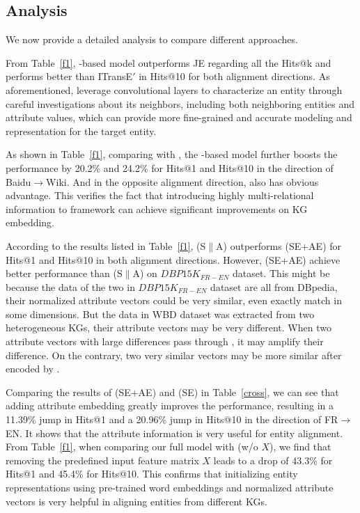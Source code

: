 \subsection{Analysis\label{sec:analysis}}



We now provide a detailed analysis to compare different approaches.

From Table~\ref{f1}, \GCN-based model outperforms JE regarding all the Hits@k and performs better than ITransE$'$ in Hits@10 for both alignment directions. As aforementioned, \GCNs leverage convolutional layers to characterize an entity through careful investigations about its neighbors, including both neighboring entities and attribute values, which can provide more fine-grained and accurate modeling and representation for the target entity.

 As shown in Table~\ref{f1}, comparing with \GCN, the \RGCN-based model further boosts the performance by 20.2\% and 24.2\% for Hits@1 and Hits@10 in the direction of Baidu$\rightarrow$Wiki. And in the opposite alignment direction, \RGCN also has obvious advantage. This verifies the fact that introducing highly multi-relational information to \GCN framework can achieve significant improvements on KG embedding.

According to the results listed in Table~\ref{f1}, \HRGCN (S$\|$A) outperforms \HRGCN (SE+AE) for Hits@1 and Hits@10 in both alignment directions. However, \HRGCN (SE+AE) achieve better performance than \HRGCN (S$\|$A) on $DBP15K_{FR-EN}$ dataset. This might be because the data of the two \KGs in $DBP15K_{FR-EN}$ dataset are all from DBpedia, their normalized attribute vectors could be very similar, even exactly match in some dimensions. But the data in WBD dataset was extracted from two heterogeneous KGs, their attribute vectors may be very different. When two attribute vectors with large differences pass through \HRGCNs, it may amplify their difference. On the contrary, two very similar vectors may be more similar after encoded by \HRGCNs.


Comparing the results of \HRGCN (SE+AE) and \HRGCN (SE) in Table~\ref{cross}, we can see that adding attribute embedding greatly improves the performance, resulting in a 11.39\% jump in Hits@1 and a 20.96\% jump in Hits@10 in the direction of FR$\rightarrow$EN. It shows that the attribute information is very useful for entity alignment.
From Table~\ref{f1}, when comparing our full model \HRGCN with \HRGCN (w/o $X$), we find that removing the predefined input feature matrix $X$ leads to a drop of 43.3\% for Hits@1 and 45.4\% for Hits@10. This confirms that initializing entity representations using pre-trained word embeddings and normalized attribute vectors is very helpful in aligning entities from different KGs.

